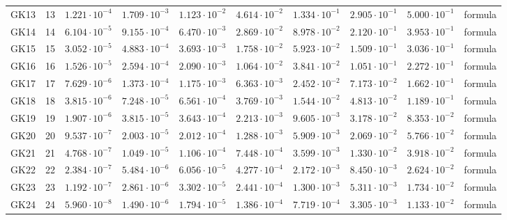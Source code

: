 {\begin{longtable}{@{}llllllllll@{}}
GK13 & 13 & $1.221\cdot 10^{-4}$ & $1.709\cdot 10^{-3}$ & $1.123\cdot 10^{-2}$ & $4.614\cdot 10^{-2}$ & $1.334\cdot 10^{-1}$ & $2.905\cdot 10^{-1}$ & $5.000\cdot 10^{-1}$ & formula \\
GK14 & 14 & $6.104\cdot 10^{-5}$ & $9.155\cdot 10^{-4}$ & $6.470\cdot 10^{-3}$ & $2.869\cdot 10^{-2}$ & $8.978\cdot 10^{-2}$ & $2.120\cdot 10^{-1}$ & $3.953\cdot 10^{-1}$ & formula \\
GK15 & 15 & $3.052\cdot 10^{-5}$ & $4.883\cdot 10^{-4}$ & $3.693\cdot 10^{-3}$ & $1.758\cdot 10^{-2}$ & $5.923\cdot 10^{-2}$ & $1.509\cdot 10^{-1}$ & $3.036\cdot 10^{-1}$ & formula \\
GK16 & 16 & $1.526\cdot 10^{-5}$ & $2.594\cdot 10^{-4}$ & $2.090\cdot 10^{-3}$ & $1.064\cdot 10^{-2}$ & $3.841\cdot 10^{-2}$ & $1.051\cdot 10^{-1}$ & $2.272\cdot 10^{-1}$ & formula \\
GK17 & 17 & $7.629\cdot 10^{-6}$ & $1.373\cdot 10^{-4}$ & $1.175\cdot 10^{-3}$ & $6.363\cdot 10^{-3}$ & $2.452\cdot 10^{-2}$ & $7.173\cdot 10^{-2}$ & $1.662\cdot 10^{-1}$ & formula \\
GK18 & 18 & $3.815\cdot 10^{-6}$ & $7.248\cdot 10^{-5}$ & $6.561\cdot 10^{-4}$ & $3.769\cdot 10^{-3}$ & $1.544\cdot 10^{-2}$ & $4.813\cdot 10^{-2}$ & $1.189\cdot 10^{-1}$ & formula \\
GK19 & 19 & $1.907\cdot 10^{-6}$ & $3.815\cdot 10^{-5}$ & $3.643\cdot 10^{-4}$ & $2.213\cdot 10^{-3}$ & $9.605\cdot 10^{-3}$ & $3.178\cdot 10^{-2}$ & $8.353\cdot 10^{-2}$ & formula \\
GK20 & 20 & $9.537\cdot 10^{-7}$ & $2.003\cdot 10^{-5}$ & $2.012\cdot 10^{-4}$ & $1.288\cdot 10^{-3}$ & $5.909\cdot 10^{-3}$ & $2.069\cdot 10^{-2}$ & $5.766\cdot 10^{-2}$ & formula \\
GK21 & 21 & $4.768\cdot 10^{-7}$ & $1.049\cdot 10^{-5}$ & $1.106\cdot 10^{-4}$ & $7.448\cdot 10^{-4}$ & $3.599\cdot 10^{-3}$ & $1.330\cdot 10^{-2}$ & $3.918\cdot 10^{-2}$ & formula \\
GK22 & 22 & $2.384\cdot 10^{-7}$ & $5.484\cdot 10^{-6}$ & $6.056\cdot 10^{-5}$ & $4.277\cdot 10^{-4}$ & $2.172\cdot 10^{-3}$ & $8.450\cdot 10^{-3}$ & $2.624\cdot 10^{-2}$ & formula \\
GK23 & 23 & $1.192\cdot 10^{-7}$ & $2.861\cdot 10^{-6}$ & $3.302\cdot 10^{-5}$ & $2.441\cdot 10^{-4}$ & $1.300\cdot 10^{-3}$ & $5.311\cdot 10^{-3}$ & $1.734\cdot 10^{-2}$ & formula \\
GK24 & 24 & $5.960\cdot 10^{-8}$ & $1.490\cdot 10^{-6}$ & $1.794\cdot 10^{-5}$ & $1.386\cdot 10^{-4}$ & $7.719\cdot 10^{-4}$ & $3.305\cdot 10^{-3}$ & $1.133\cdot 10^{-2}$ & formula \\

\end{longtable}}
